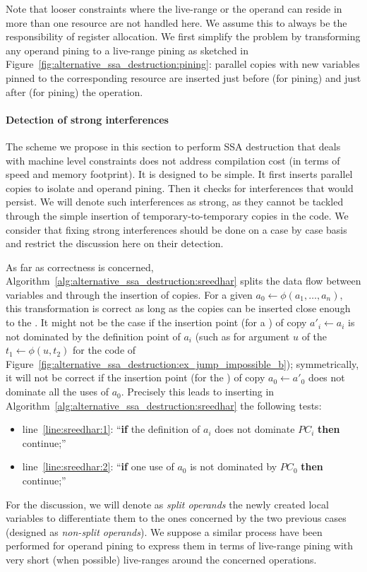 Note that looser constraints where the live-range or the operand can reside in more than one resource are not handled here. We assume this to always be the responsibility of register allocation.
We first simplify the problem by transforming any operand pining to a live-range pining as sketched in Figure~\ref{fig:alternative_ssa_destruction:pining}: parallel copies with new variables pinned to the corresponding resource are inserted just before (for \useop pining) and just after (for  pining) the operation.




\paragraph{Detection of strong interferences}
\label{par:alternative_ssa_destruction:strong}
The scheme we propose in this section to perform SSA destruction that deals with machine level constraints does not address compilation cost (in terms of speed and memory footprint). It is designed to be simple. It first inserts parallel copies to isolate \phifuns and operand pining. Then it checks for interferences that would persist. We will denote such interferences as strong, as they cannot be tackled through the simple insertion of temporary-to-temporary copies in the code. We consider that fixing strong interferences should be done on a case by case basis and restrict the discussion here on their detection.

As far as correctness is concerned, Algorithm~\ref{alg:alternative_ssa_destruction:sreedhar} splits the data flow between variables and \phinodes through the insertion of copies. For a given \phifun $a_0\gets \phi(a_1,\dots,a_n)$, this transformation is correct as long as the copies can be inserted close enough to the \phifun. It might not be the case if the insertion point (for a \useop) of copy $a'_i\gets a_i$ is not dominated by the definition point of $a_i$ (such as for argument $u$ of the \phifun $t_1\gets \phi(u,t_2)$ for the code of Figure~\ref{fig:alternative_ssa_destruction:ex_jump_impossible_b}); symmetrically, it will not be correct if the insertion point (for the ) of copy $a_0\gets a'_0$ does not dominate all the uses of $a_0$. Precisely this leads to inserting in Algorithm~\ref{alg:alternative_ssa_destruction:sreedhar} the following tests:
\begin{itemize}
\item line~\ref{line:sreedhar:1}: ``{\bf if} the definition of $a_i$ does not dominate $PC_i$ {\bf then} continue;''
\item line~\ref{line:sreedhar:2}: ``{\bf if} one use of $a_0$ is not dominated by $PC_0$ {\bf then} continue;''
\end{itemize}
For the discussion, we will denote as \emph{split operands} the newly created local variables to differentiate them to the ones concerned by the two previous cases (designed as \emph{non-split operands}).
% 
We suppose a similar process have been performed for operand pining to express them in terms of live-range pining with very short (when possible) live-ranges around the concerned operations. 

